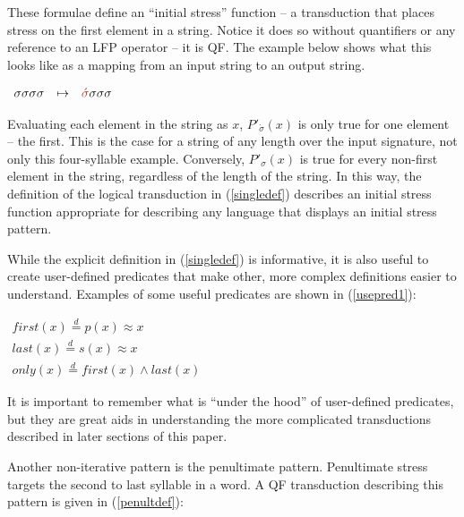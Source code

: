 \documentclass[12pt]{article}
\newcommand{\sig}{\sigma}
\newcommand{\deq}{\stackrel{d}{=}}
\newcommand{\ass}{\acute{\sig}}
\newcommand{\brass}{{\color{BrickRed}{\ass}}}
\begin{document}
\noindent
These formulae define an ``initial stress'' function -- a transduction that places stress on the first element in a string. Notice it does so without quantifiers or any reference to an LFP operator -- it is QF. The example below shows what this looks like as a mapping from an input string to an output string.

\begin{exe}

\item 
$\begin{array}[t]{lll}
  	\sig\sig\sig\sig                 & \mapsto & \brass\sig\sig\sig                 \\

  	
 	\end{array}$
 	\label{singlestressmap}
\end{exe}	
 	
Evaluating each element in the string as $x$, $P'_\ass(x)$ is only true for one element -- the first. This is the case for a string of any length over the input signature, not only this four-syllable example. Conversely, $P'_\sig(x)$ is true for every non-first element in the string, regardless of the length of the string. In this way, the definition of the logical transduction in (\ref{singledef}) describes an initial stress function appropriate for describing any language that displays an initial stress pattern. 

While the explicit definition in (\ref{singledef}) is informative, it is also useful to create user-defined predicates that make other, more complex definitions easier to understand. Examples of some useful predicates are shown in (\ref{usepred1}):

\begin{exe}
\item $\begin{array}{l}
   first(x) \deq  p(x) \approx x  \\
   last(x) \deq s(x) \approx x \\
   only(x) \deq first(x) \land last(x)
\end{array} $
\label{usepred1}
\end{exe}

\noindent
It is important to remember what is ``under the hood'' of user-defined predicates, but they are great aids in understanding the more complicated transductions described in later sections of this paper.

Another non-iterative pattern is the penultimate pattern. Penultimate stress targets the second to last syllable in a word. A QF transduction describing this pattern is given in (\ref{penultdef}):
\end{document}
